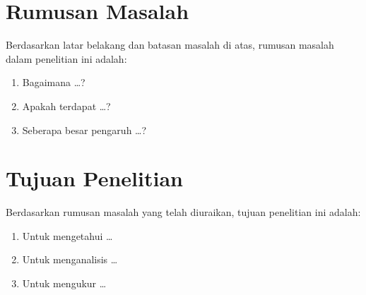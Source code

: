 \section{Rumusan Masalah}
\label{sec:rumusan-masalah}

Berdasarkan latar belakang dan batasan masalah di atas, rumusan masalah dalam
penelitian ini adalah:

\begin{enumerate}
  \item Bagaimana \ldots?
  \item Apakah terdapat \ldots?
  \item Seberapa besar pengaruh \ldots?
\end{enumerate}

\section{Tujuan Penelitian}
\label{sec:tujuan}

Berdasarkan rumusan masalah yang telah diuraikan, tujuan penelitian ini adalah:

\begin{enumerate}
  \item Untuk mengetahui \ldots
  \item Untuk menganalisis \ldots
  \item Untuk mengukur \ldots
\end{enumerate}

